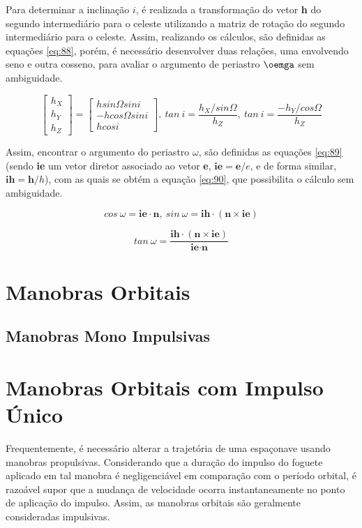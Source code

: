 Para determinar a inclinação $i$, é realizada a transformação do vetor \textbf{h} do segundo intermediário para o celeste utilizando a matriz de rotação do segundo intermediário para o celeste. Assim, realizando os cálculos, são definidas as equações \ref{eq:88}, porém, é necessário desenvolver duas relações, uma envolvendo seno e outra cosseno, para avaliar o argumento de periastro $\oemga$ sem ambiguidade.

\begin{equation}
 \left[\begin{array}{l}
h_{X} \\
h_{Y}  \\
h_{Z} 
\end{array}\right] = 
\left[\begin{array}{l}
hsin\Omega sin i \\
-hcos\Omega sin i \\
h cos i
\end{array}\right], \ tan \ i = \frac{h_{X}/sin\Omega}{h_{Z}}, \ tan \ i = \frac{-h_{Y}/cos\Omega}{h_{Z}}
\label{eq:88}
\end{equation}

Assim, encontrar o argumento do periastro $\omega$, são definidas as equações \ref{eq:89} (sendo \textbf{ie} um vetor diretor associado ao vetor \textbf{e}, $\textbf{ie} = \textbf{e}/e$, e de forma similar, $\textbf{ih} = \textbf{h}/h$), com as quais se obtém a equação \ref{eq:90}, que possibilita o cálculo sem ambiguidade.

\begin{equation}
    cos \ \omega = \textbf{ie}  \cdot \textbf{n}, \ sin \ \omega = \textbf{ih} \cdot (\textbf{n} \times \textbf{ie})
    \label{eq:89}
\end{equation}

\begin{equation}
    tan \ \omega = \frac{\textbf{ih} \cdot (\textbf{n} \times \textbf{ie})}{\textbf{ie} \cdot \textbf{n}}
    \label{eq:90}
\end{equation}

\section{Manobras Orbitais}
\subsection{Manobras Mono Impulsivas}

\section{Manobras Orbitais com Impulso Único}
Frequentemente, é necessário alterar a trajetória de uma espaçonave usando manobras propulsivas. Considerando que a duração do impulso do foguete aplicado em tal manobra é negligenciável em comparação com o período orbital, é razoável supor que a mudança de velocidade ocorra instantaneamente no ponto de aplicação do impulso. Assim, as manobras orbitais são geralmente consideradas impulsivas.

